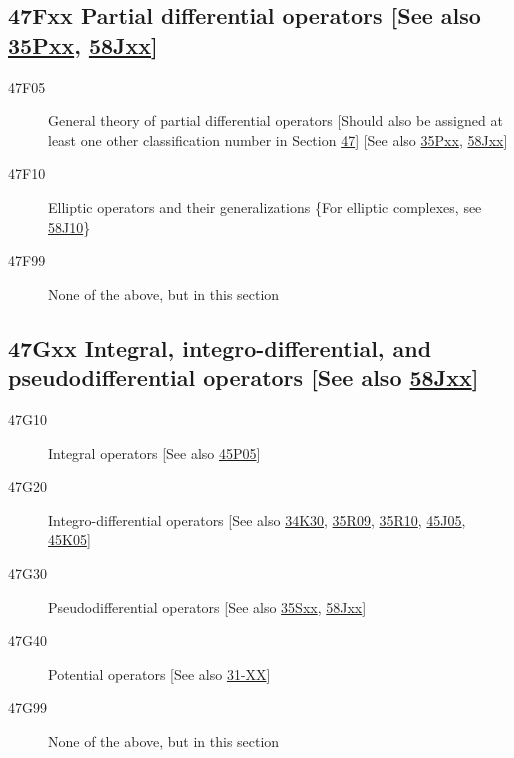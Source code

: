 \documentclass[letterpaper]{article}
\begin{document}
\subsection*{47Fxx  Partial differential operators [See also \hyperref[35Pxx]{35Pxx}, \hyperref[58Jxx]{58Jxx}] }\label{47Fxx}
\begin{description}  
\item [47F05]\label{47F05} General theory of partial differential operators [Should also be assigned at least one other classification number in Section \hyperref[47-XX]{47}] [See also \hyperref[35Pxx]{35Pxx}, \hyperref[58Jxx]{58Jxx}]
\item [47F10]\label{47F10} Elliptic operators and their generalizations \{For elliptic complexes, see \hyperref[58J10]{58J10}\}
\item [47F99]\label{47F99} None of the above, but in this section
\end{description}
\subsection*{47Gxx  Integral, integro-differential, and pseudodifferential operators [See also \hyperref[58Jxx]{58Jxx}] }\label{47Gxx}
\begin{description}  
\item [47G10]\label{47G10} Integral operators [See also \hyperref[45P05]{45P05}]
\item [47G20]\label{47G20} Integro-differential operators [See also \hyperref[34K30]{34K30}, \hyperref[35R09]{35R09}, \hyperref[35R10]{35R10}, \hyperref[45J05]{45J05}, \hyperref[45K05]{45K05}]
\item [47G30]\label{47G30} Pseudodifferential operators [See also \hyperref[35Sxx]{35Sxx}, \hyperref[58Jxx]{58Jxx}]
\item [47G40]\label{47G40} Potential operators [See also \hyperref[31-XX]{31-XX}]
\item [47G99]\label{47G99} None of the above, but in this section
\end{description}
\end{document}

